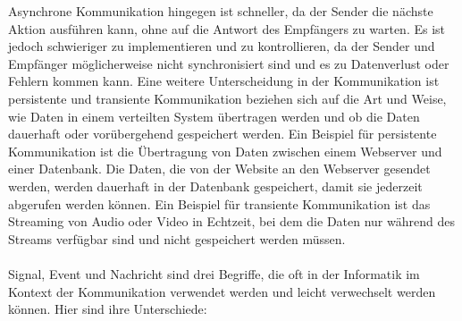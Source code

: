 \documentclass[../vs-script-first-v01.tex]{subfiles}
\begin{document}
Asynchrone Kommunikation hingegen ist schneller, da der Sender die nächste Aktion ausführen kann, ohne auf die Antwort des Empfängers zu warten. Es ist jedoch schwieriger zu implementieren und zu kontrollieren, da der Sender und Empfänger möglicherweise nicht synchronisiert sind und es zu Datenverlust oder Fehlern kommen kann. 
Eine weitere Unterscheidung in der Kommunikation ist persistente und transiente Kommunikation beziehen sich auf die Art und Weise, wie Daten in einem verteilten System übertragen werden und ob die Daten dauerhaft oder vorübergehend gespeichert werden.
Ein Beispiel für persistente Kommunikation ist die Übertragung von Daten zwischen einem Webserver und einer Datenbank. Die Daten, die von der Website an den Webserver gesendet werden, werden dauerhaft in der Datenbank gespeichert, damit sie jederzeit abgerufen werden können. Ein Beispiel für transiente Kommunikation ist das Streaming von Audio oder Video in Echtzeit, bei dem die Daten nur während des Streams verfügbar sind und nicht gespeichert werden müssen.
\\\\
Signal, Event und Nachricht sind drei Begriffe, die oft in der Informatik im Kontext der Kommunikation verwendet werden und leicht verwechselt werden können. Hier sind ihre Unterschiede:
\end{document}
